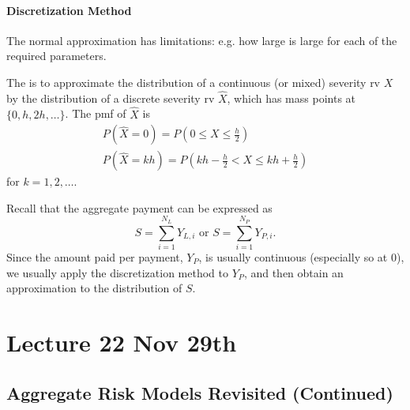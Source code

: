 \documentclass[notoc,notitlepage]{tufte-book}
\begin{document}
\subsubsection{Discretization Method}%
\label{ssub:discretization_method}

The normal approximation has limitations: e.g. how large is large for each of the required parameters.

\begin{defn}\label{defn:discretization_method}
  The  is to approximate the distribution of a continuous (or mixed) severity rv $X$ by the distribution of a discrete severity rv $\hat{X}$, which has mass points at $\{ 0, h, 2h, \ldots \}$. The pmf of $\hat{X}$ is
  \begin{gather*}
    P \left( \hat{X} = 0 \right) = P \left( 0 \leq X \leq \frac{h}{2} \right) \\
    P \left( \hat{X} = kh \right) = P \left( kh - \frac{h}{2} < X \leq kh + \frac{h}{2} \right)
  \end{gather*}
  for $k = 1, 2, \ldots$.
\end{defn}

\begin{remark}
  Recall that the aggregate payment can be expressed as
  \begin{equation*}
    S = \sum_{i=1}^{N_L} Y_{L, i} \text{ or } S = \sum_{i=1}^{N_P} Y_{P, i}.
  \end{equation*}
  Since the amount paid per payment, $Y_P$, is usually continuous (especially so at $0$), we usually apply the discretization method to $Y_P$, and then obtain an approximation to the distribution of $S$.
\end{remark}





\chapter{Lecture 22 Nov 29th}%
\label{chp:lecture_22_nov_29th}

\section{Aggregate Risk Models Revisited (Continued)}%
\label{sec:aggregate_risk_models_revisited_continued}
\end{document}

